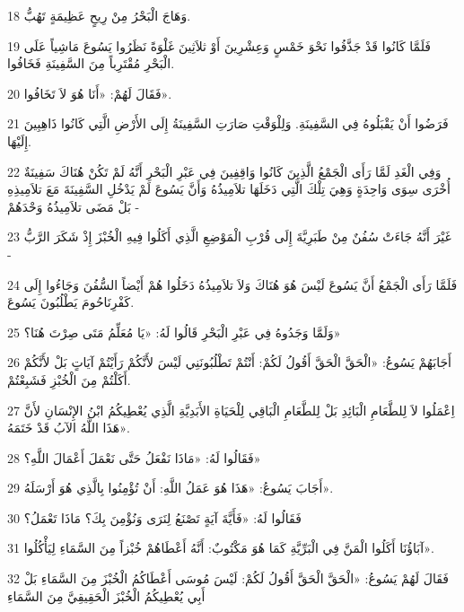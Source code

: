 \par 18 وَهَاجَ الْبَحْرُ مِنْ رِيحٍ عَظِيمَةٍ تَهُبُّ.
\par 19 فَلَمَّا كَانُوا قَدْ جَذَّفُوا نَحْوَ خَمْسٍ وَعِشْرِينَ أَوْ ثلاَثِينَ غَلْوَةً نَظَرُوا يَسُوعَ مَاشِياً عَلَى الْبَحْرِ مُقْتَرِباً مِنَ السَّفِينَةِ فَخَافُوا.
\par 20 فَقَالَ لَهُمْ: «أَنَا هُوَ لاَ تَخَافُوا».
\par 21 فَرَضُوا أَنْ يَقْبَلُوهُ فِي السَّفِينَةِ. وَلِلْوَقْتِ صَارَتِ السَّفِينَةُ إِلَى الأَرْضِ الَّتِي كَانُوا ذَاهِبِينَ إِلَيْهَا.
\par 22 وَفِي الْغَدِ لَمَّا رَأَى الْجَمْعُ الَّذِينَ كَانُوا وَاقِفِينَ فِي عَبْرِ الْبَحْرِ أَنَّهُ لَمْ تَكُنْ هُنَاكَ سَفِينَةٌ أُخْرَى سِوَى وَاحِدَةٍ وَهِيَ تِلْكَ الَّتِي دَخَلَهَا تلاَمِيذُهُ وَأَنَّ يَسُوعَ لَمْ يَدْخُلِ السَّفِينَةَ مَعَ تلاَمِيذِهِ بَلْ مَضَى تلاَمِيذُهُ وَحْدَهُمْ -
\par 23 غَيْرَ أَنَّهُ جَاءَتْ سُفُنٌ مِنْ طَبَرِيَّةَ إِلَى قُرْبِ الْمَوْضِعِ الَّذِي أَكَلُوا فِيهِ الْخُبْزَ إِذْ شَكَرَ الرَّبُّ -
\par 24 فَلَمَّا رَأَى الْجَمْعُ أَنَّ يَسُوعَ لَيْسَ هُوَ هُنَاكَ وَلاَ تلاَمِيذُهُ دَخَلُوا هُمْ أَيْضاً السُّفُنَ وَجَاءُوا إِلَى كَفْرِنَاحُومَ يَطْلُبُونَ يَسُوعَ.
\par 25 وَلَمَّا وَجَدُوهُ فِي عَبْرِ الْبَحْرِ قَالُوا لَهُ: «يَا مُعَلِّمُ مَتَى صِرْتَ هُنَا؟»
\par 26 أَجَابَهُمْ يَسُوعُ: «الْحَقَّ الْحَقَّ أَقُولُ لَكُمْ: أَنْتُمْ تَطْلُبُونَنِي لَيْسَ لأَنَّكُمْ رَأَيْتُمْ آيَاتٍ بَلْ لأَنَّكُمْ أَكَلْتُمْ مِنَ الْخُبْزِ فَشَبِعْتُمْ.
\par 27 اِعْمَلُوا لاَ لِلطَّعَامِ الْبَائِدِ بَلْ لِلطَّعَامِ الْبَاقِي لِلْحَيَاةِ الأَبَدِيَّةِ الَّذِي يُعْطِيكُمُ ابْنُ الإِنْسَانِ لأَنَّ هَذَا اللَّهُ الآبُ قَدْ خَتَمَهُ».
\par 28 فَقَالُوا لَهُ: «مَاذَا نَفْعَلُ حَتَّى نَعْمَلَ أَعْمَالَ اللَّهِ؟»
\par 29 أَجَابَ يَسُوعُ: «هَذَا هُوَ عَمَلُ اللَّهِ: أَنْ تُؤْمِنُوا بِالَّذِي هُوَ أَرْسَلَهُ».
\par 30 فَقَالُوا لَهُ: «فَأَيَّةَ آيَةٍ تَصْنَعُ لِنَرَى وَنُؤْمِنَ بِكَ؟ مَاذَا تَعْمَلُ؟
\par 31 آبَاؤُنَا أَكَلُوا الْمَنَّ فِي الْبَرِّيَّةِ كَمَا هُوَ مَكْتُوبٌ: أَنَّهُ أَعْطَاهُمْ خُبْزاً مِنَ السَّمَاءِ لِيَأْكُلُوا».
\par 32 فَقَالَ لَهُمْ يَسُوعُ: «الْحَقَّ الْحَقَّ أَقُولُ لَكُمْ: لَيْسَ مُوسَى أَعْطَاكُمُ الْخُبْزَ مِنَ السَّمَاءِ بَلْ أَبِي يُعْطِيكُمُ الْخُبْزَ الْحَقِيقِيَّ مِنَ السَّمَاءِ
